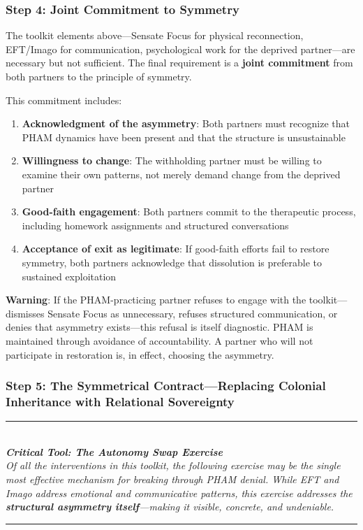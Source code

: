 \documentclass[12pt, letterpaper]{article}
\begin{document}
\subsubsection{Step 4: Joint Commitment to Symmetry}

The toolkit elements above---Sensate Focus for physical reconnection, EFT/Imago for communication, psychological work for the deprived partner---are necessary but not sufficient. The final requirement is a \textbf{joint commitment} from both partners to the principle of symmetry.

This commitment includes:

\begin{enumerate}
    \item \textbf{Acknowledgment of the asymmetry}: Both partners must recognize that PHAM dynamics have been present and that the structure is unsustainable
    \item \textbf{Willingness to change}: The withholding partner must be willing to examine their own patterns, not merely demand change from the deprived partner
    \item \textbf{Good-faith engagement}: Both partners commit to the therapeutic process, including homework assignments and structured conversations
    \item \textbf{Acceptance of exit as legitimate}: If good-faith efforts fail to restore symmetry, both partners acknowledge that dissolution is preferable to sustained exploitation
\end{enumerate}

\textbf{Warning}: If the PHAM-practicing partner refuses to engage with the toolkit---dismisses Sensate Focus as unnecessary, refuses structured communication, or denies that asymmetry exists---this refusal is itself diagnostic. PHAM is maintained through avoidance of accountability. A partner who will not participate in restoration is, in effect, choosing the asymmetry.

\subsubsection{Step 5: The Symmetrical Contract---Replacing Colonial Inheritance with Relational Sovereignty}

\begin{center}
\rule{0.5\textwidth}{0.4pt}\\[0.5em]
\textit{\textbf{Critical Tool: The Autonomy Swap Exercise}}\\[0.3em]
\textit{Of all the interventions in this toolkit, the following exercise may be the single most effective mechanism for breaking through PHAM denial. While EFT and Imago address emotional and communicative patterns, this exercise addresses the \textbf{structural asymmetry itself}---making it visible, concrete, and undeniable.}\\[0.5em]
\rule{0.5\textwidth}{0.4pt}
\end{center}
\end{document}
